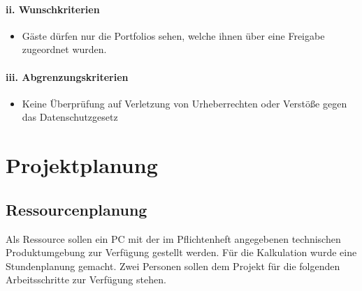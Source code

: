 \documentclass[10.5pt]{scrarticle}
\begin{document}
\paragraph{ii. Wunschkriterien}

\begin{itemize}
\item Gäste dürfen nur die Portfolios sehen, welche ihnen über eine Freigabe zugeordnet wurden.
\end{itemize}

\paragraph{iii. Abgrenzungskriterien}

\begin{itemize}
\item Keine Überprüfung auf Verletzung von Urheberrechten oder Verstöße gegen das    Datenschutzgesetz
\end{itemize}


\section{Projektplanung}
\subsection{Ressourcenplanung}
Als Ressource sollen ein PC mit der im Pflichtenheft angegebenen technischen Produktumgebung zur Verfügung gestellt werden. Für die Kalkulation wurde eine Stundenplanung gemacht. Zwei Personen sollen dem Projekt für die folgenden Arbeitsschritte zur Verfügung stehen.
\end{document}
